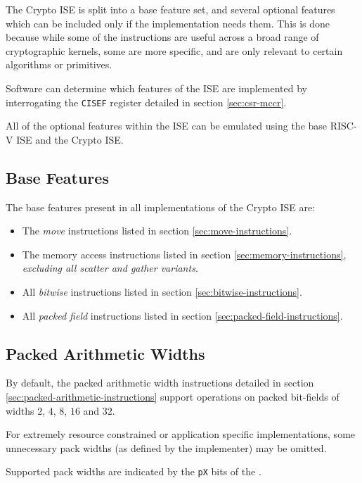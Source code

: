 
\label{sec:feature-sets}

The Crypto ISE is split into a base feature set, and several optional
features which can be included only if the implementation needs them.
This is done because while some of the instructions are useful across a
broad range of cryptographic kernels, some are more specific, and are only
relevant to certain algorithms or primitives.

Software can determine which features of the ISE are implemented by
interrogating the {\tt CISEF} register detailed in section
\ref{sec:csr-mccr}.

All of the optional features within the ISE can be emulated using the
base RISC-V ISE and the Crypto ISE.

\subsection{Base Features}

The base features present in all implementations of the Crypto ISE are:
\begin{itemize}
\item The {\em move} instructions listed in section
    \ref{sec:move-instructions}.
\item The memory access instructions listed in section
    \ref{sec:memory-instructions}, {\em excluding all scatter and gather
    variants}.
\item All {\em bitwise} instructions listed in section
    \ref{sec:bitwise-instructions}.
\item All {\em packed field} instructions listed in section
    \ref{sec:packed-field-instructions}.
\end{itemize}

\subsection{Packed Arithmetic Widths}

By default, the packed arithmetic width instructions detailed in
section \ref{sec:packed-arithmetic-instructions} support operations on
packed bit-fields of widths $2$, $4$, $8$, $16$ and $32$.

For extremely resource constrained or application specific implementations,
some unnecessary pack widths (as defined by the implementer) may be omitted.

Supported pack widths are indicated by the {\tt pX} bits of the
.

